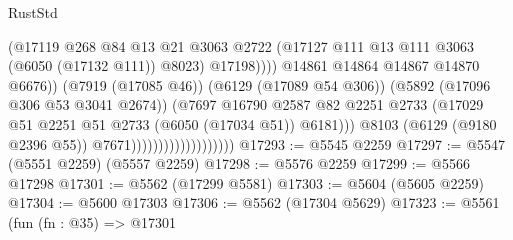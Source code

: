 \begin{lexlean}{RustStd}
\begin{coremodule}
                                                      (@17119
                                                        @268
                                                        @84
                                                        @13
                                                        @21
                                                        @3063
                                                        @2722
                                                        (@17127
                                                          @111
                                                          @13
                                                          @111
                                                          @3063
                                                          (@6050 (@17132 @111))
                                                          @8023)
                                                        @17198))))
                                                @14861
                                                @14864
                                                @14867
                                                @14870
                                                @6676))
                                            (@7919 (@17085 @46))
                                            (@6129 (@17089 @54 @306))
                                            (@5892 (@17096 @306 @53 @3041 @2674))
                                            (@7697
                                              @16790
                                              @2587
                                              @82
                                              @2251
                                              @2733
                                              (@17029
                                                @51
                                                @2251
                                                @51
                                                @2733
                                                (@6050 (@17034 @51))
                                                @6181)))
                                          @8103
                                          (@6129 (@9180 @2396 @55))
                                          @7671)))))))))))))))))))
@17293 := @5545 @2259
@17297 := @5547 (@5551 @2259) (@5557 @2259)
@17298 := @5576 @2259
@17299 := @5566 @17298
@17301 := @5562 (@17299 @5581)
@17303 := @5604 (@5605 @2259)
@17304 := @5600 @17303
@17306 := @5562 (@17304 @5629)
@17323 := @5561
    (fun (fn : @35) =>
    @17301

\end{coremodule}
\end{lexlean}
